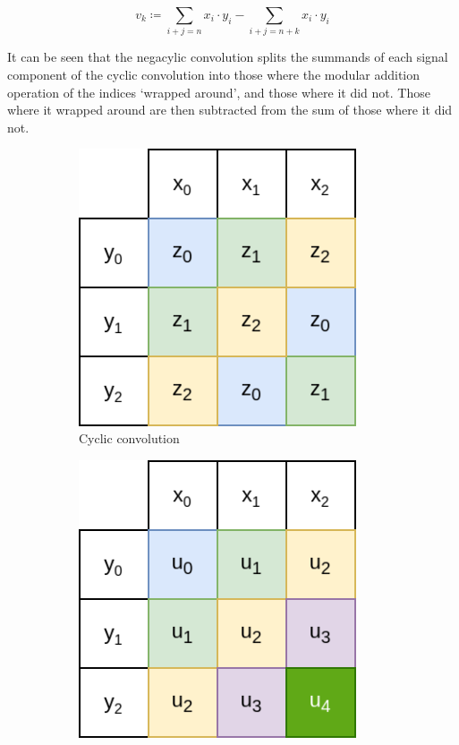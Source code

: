 \[
		v_k \coloneqq \sum_{i + j = n} x_i \cdot y_i - \sum_{i + j = n + k} x_i \cdot y_i
\]

It can be seen that the negacylic convolution splits the summands of each
signal component of the cyclic convolution into those where the modular
addition operation of the indices `wrapped around', and those where it did not.
Those where it wrapped around are then subtracted from the sum of those where
it did not.

\begin{figure}
		\centering
		\begin{subfigure}{.33\textwidth}
				\centering
				\includegraphics[width=0.9\textwidth]{../resources/cyclic_convolution.drawio.png}
				\caption{Cyclic convolution}
				\label{fig:cyclic_convolution}
		\end{subfigure}%
		\begin{subfigure}{.33\textwidth}
				\centering
				\includegraphics[width=0.9\textwidth]{../resources/acyclic_convolution.drawio.png}

\end{subfigure}
\end{figure}
